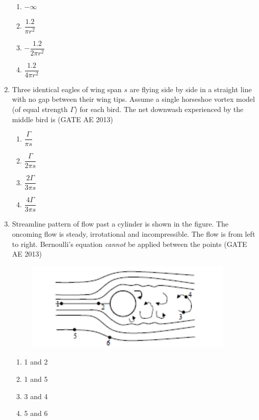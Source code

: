 \documentclass[journal,12pt,onecolumn]{IEEEtran}
\theoremstyle{remark}
\begin{document}
\begin{flushleft}
\begin{enumerate}
\begin{multicols}{2}
\begin{enumerate}
  \item $-\infty$
  \item $\dfrac{1.2}{\pi r^{2}}$
  \item $-\dfrac{1.2}{2\pi r^{2}}$
  \item $\dfrac{1.2}{4\pi r^{2}}$
\end{enumerate}
\end{multicols}

\item Three identical eagles of wing span $s$ are flying side by side in a straight line with no gap between their wing tips. Assume a single horseshoe vortex model (of equal strength $\Gamma$) for each bird. The net downwash experienced by the middle bird is
\hfill(GATE AE 2013)

\begin{multicols}{2}
\begin{enumerate}
  \item $\dfrac{\Gamma}{\pi s}$
  \item $\dfrac{\Gamma}{2\pi s}$
  \item $\dfrac{2\Gamma}{3\pi s}$
  \item $\dfrac{4\Gamma}{3\pi s}$
\end{enumerate}
\end{multicols}

\item Streamline pattern of flow past a cylinder is shown in the figure. The oncoming flow is steady, irrotational and incompressible. The flow is from left to right. Bernoulli's equation \emph{cannot} be applied between the points
\hfill(GATE AE 2013)
\begin{figure}[H]
    \centering
    \includegraphics[width=0.5\columnwidth]{figs/36.png}
    \caption{}
    \label{fig:placeholder}
\end{figure}
\begin{multicols}{2}
\begin{enumerate}
  \item 1 and 2
  \item 1 and 5
  \item 3 and 4
  \item 5 and 6
\end{enumerate}
\end{multicols}


\end{enumerate}
\end{flushleft}
\end{document}
